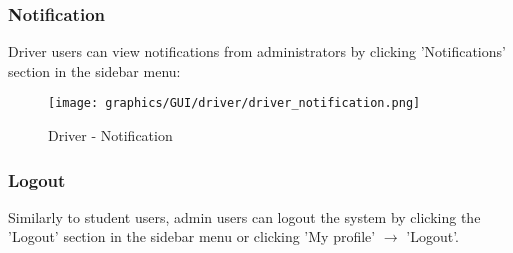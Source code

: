          \subsubsection{Notification}
                \noindent Driver users can view notifications from administrators by clicking 'Notifications' section in the sidebar menu:
                    \begin{figure}[H]
                        \centering
                        \texttt{[image: graphics/GUI/driver/driver\_notification.png]}
                        \caption{Driver - Notification}
                    \label{fig:driver_noti}
                    \end{figure}

        \subsubsection{Logout} 
            \noindent Similarly to student users, admin users can logout the system by clicking the 'Logout' section in the sidebar menu or clicking 'My profile' $\rightarrow$ 'Logout'.
        

